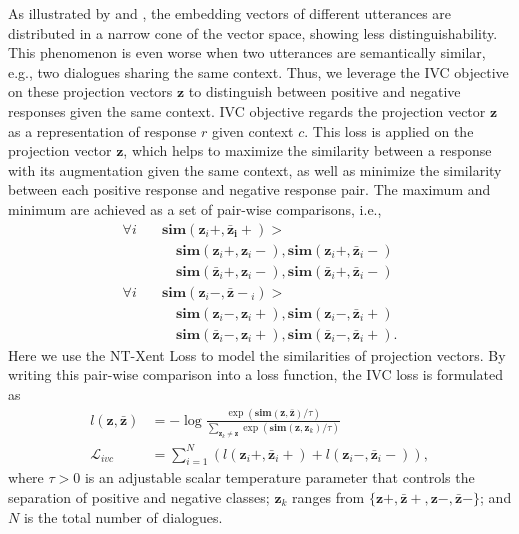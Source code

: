 \documentclass[letterpaper]{article} \usepackage{aaai22}  \usepackage{times}  \usepackage{helvet}  \usepackage{courier}  \usepackage[hyphens]{url}  \usepackage{graphicx} \urlstyle{rm} \def\UrlFont{\rm}  \usepackage{natbib}  \usepackage{caption} \DeclareCaptionStyle{ruled}{labelfont=normalfont,labelsep=colon,strut=off} \frenchspacing  \setlength{\pdfpagewidth}{8.5in}  \setlength{\pdfpageheight}{11in}  \usepackage{algorithm}
\begin{document}
As illustrated by \citet{ethayarajh-2019-contextual} and \citet{li-etal-2020-sentence}, the embedding vectors of different utterances are distributed in a narrow cone of the vector space, showing less distinguishability. This phenomenon is even worse when two utterances are semantically similar, e.g., two dialogues sharing the same context. Thus, we leverage the IVC objective on these projection vectors $\mathbf{z}$ to distinguish between positive and negative responses given the same context. IVC objective regards the projection vector $\mathbf{z}$ as a representation of response $r$ given context $c$. This loss is applied on the projection vector $\mathbf{z}$, which helps to maximize the similarity between a response with its augmentation given the same context, as well as minimize the similarity between each positive response and negative response pair. The maximum and minimum are achieved as a set of pair-wise comparisons, i.e.,
\begin{equation}
    \begin{aligned}
    \forall i \quad
    &\mathbf{sim} (\mathbf{z}_i+, \mathbf{\bar{z}_i+}) > \\
    &\quad \mathbf{sim}(\mathbf{z}_i+, \mathbf{z}_i-), \mathbf{sim}(\mathbf{z}_i+, \mathbf{\bar{z}}_i-) \\
    &\quad \mathbf{sim}(\mathbf{\bar{z}}_i+, \mathbf{z}_i-), \mathbf{sim}(\mathbf{\bar{z}}_i+, \mathbf{\bar{z}}_i-) \\
    \forall i \quad
    &\mathbf{sim} (\mathbf{z}_i-, \mathbf{\bar{z}-}_i) > \\
    &\quad \mathbf{sim}(\mathbf{z}_i-, \mathbf{z}_i+), \mathbf{sim}(\mathbf{z}_i-, \mathbf{\bar{z}}_i+) \\
    &\quad \mathbf{sim}(\mathbf{\bar{z}}_i-, \mathbf{z}_i+), \mathbf{sim}(\mathbf{\bar{z}}_i-, \mathbf{\bar{z}}_i+).
    \end{aligned}
\end{equation}
Here we use the NT-Xent Loss \cite{chen2020simple} to model the similarities of projection vectors. By writing this pair-wise comparison into a loss function, the IVC loss is formulated as 
\begin{equation}
    \begin{aligned}
    \!\! l (\mathbf{z}, \mathbf{\bar{z}}) &= -\log \frac{\exp (\mathbf{sim} (\mathbf{z}, \mathbf{\bar{z}}) / \tau)}{\sum\limits_{\mathbf{z}_k \neq \mathbf{z}} \exp (\mathbf{sim} (\mathbf{z}, \mathbf{z}_k) / \tau)} \\
    \!\! \mathcal{L}_{ivc} &= \sum_{i=1}^{N} \left( l\left(\mathbf{z}_i+, \mathbf{\bar{z}}_i+\right) + l\left(\mathbf{z}_i-, \mathbf{\bar{z}}_i-\right) \right),
    \end{aligned}
\end{equation} where $\tau > 0$ is an adjustable scalar temperature parameter that controls the separation of positive and negative classes; $\mathbf{z}_k$ ranges from $\{\mathbf{z}+, \mathbf{\bar{z}+}, \mathbf{z}-, \mathbf{\bar{z}}-\}$; and $N$ is the total number of dialogues.
\end{document}
